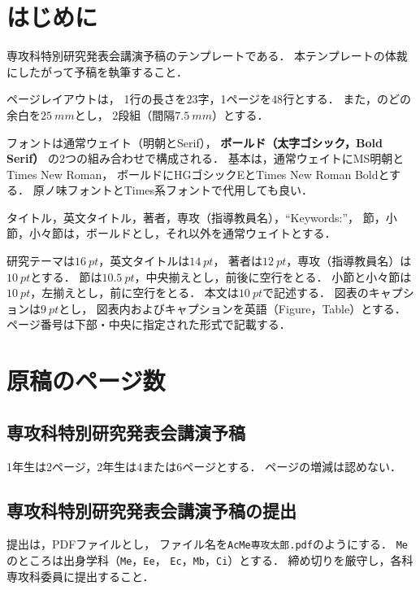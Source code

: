 \documentclass[fonts=default, dvipdfmx]{ac-preprint}
\begin{document}
\maketitle

\section{はじめに}

専攻科特別研究発表会講演予稿のテンプレートである．
本テンプレートの体裁にしたがって予稿を執筆すること．

ページレイアウトは，
1行の長さを$23$字，1ページを$48$行とする．
また，のどの余白を$\SI{25}{mm}$とし，
2段組（間隔$\SI{7.5}{mm}$）とする．

フォントは通常ウェイト（明朝とSerif），
\textbf{ボールド（太字ゴシック，Bold Serif）}
の2つの組み合わせで構成される．
基本は，通常ウェイトにMS明朝とTimes New Roman，
ボールドにHGゴシックEとTimes New Roman Boldとする．
原ノ味フォントとTimes系フォントで代用しても良い．

タイトル，英文タイトル，著者，専攻（指導教員名），``Keywords:''，
節，小節，小々節は，ボールドとし，それ以外を通常ウェイトとする．

研究テーマは$\SI{16}{pt}$，英文タイトルは$\SI{14}{pt}$，
著者は$\SI{12}{pt}$，専攻（指導教員名）は$\SI{10}{pt}$とする．
節は$\SI{10.5}{pt}$，中央揃えとし，前後に空行をとる．
小節と小々節は$\SI{10}{pt}$，左揃えとし，前に空行をとる．
本文は$\SI{10}{pt}$で記述する．
図表のキャプションは$\SI{9}{pt}$とし，
図表内およびキャプションを英語（Figure，Table）とする．
ページ番号は下部・中央に指定された形式で記載する．

\section{原稿のページ数}

\subsection{専攻科特別研究発表会講演予稿}

1年生は2ページ，2年生は4または6ページとする．
ページの増減は認めない．

\subsection{専攻科特別研究発表会講演予稿の提出}

提出は，PDFファイルとし，
ファイル名を\texttt{AcMe\mbox{}専攻太郎.pdf}のようにする．
\texttt{Me}のところは出身学科（\texttt{Me}，\texttt{Ee}，
\texttt{Ec}，\texttt{Mb}，\texttt{Ci}）とする．
締め切りを厳守し，各科専攻科委員に提出すること．
\end{document}
